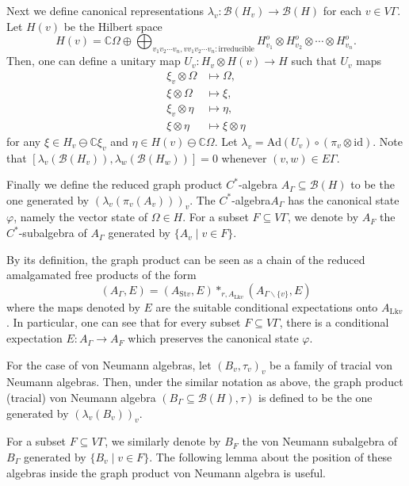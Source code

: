 \documentclass{amsart}
\theoremstyle{definition}
\renewcommand{\subset}{\subseteq}
\newcommand{\C}{\mathbb{C}}
\newcommand{\Cstaralg}{$C^{\ast}$-algebra\xspace}
\begin{document}
Next we define canonical representations $\lambda_v : \mathcal{B}(H_v) \to \mathcal{B}(H)$ for each $v\in V\Gamma$. Let $H(v)$ be the Hilbert space 
\[
H(v)=\mathbb{C}\Omega \oplus \bigoplus_{v_1v_2\cdots v_n, vv_1v_2\cdots v_n : \text{irreducible}} H_{v_1}^o \otimes H_{v_2}^o \otimes \cdots \otimes H_{v_n}^o. 
\]
Then, one can define a unitary map $U_v : H_v\otimes H(v) \to H$ such that
$U_v$ maps
\begin{align}
\xi_v\otimes \Omega &\longmapsto \Omega, \\
\xi\otimes \Omega &\longmapsto \xi, \\
\xi_v\otimes \eta &\longmapsto \eta, \\
\xi\otimes \eta &\longmapsto \xi\otimes \eta
\end{align}
for any $\xi\in H_v\ominus \C \xi_v$ and $\eta\in H(v)\ominus \C \Omega$. 
Let $\lambda_v = \mathrm{Ad}(U_v) \circ (\pi_v\otimes \mathrm{id})$. 
Note that $[\lambda_v(\mathcal{B}(H_v)), \lambda_w(\mathcal{B}(H_w))]=0$ whenever $(v,w)\in E\Gamma$. 

Finally we define the reduced graph product $C^{\ast}$-algebra
$A_{\Gamma}\subset \mathcal{B}(H)$ to be the one generated by
$(\lambda_v(\pi_v(A_v)))_v$. The \Cstaralg $A_{\Gamma}$ has the canonical state $\varphi$, namely the vector state of $\Omega \in H$. For a subset $F\subset V\Gamma$, we denote by $A_F$ the $C^{\ast}$-subalgebra of $A_{\Gamma}$ generated by $\{ A_v\mid v\in F\}$.  

By its definition, the graph product can be seen as a chain of the reduced amalgamated free products of the form
\[
(A_{\Gamma}, E)=(A_{\mathrm{St}v}, E) \ast_{r, A_{\mathrm{Lk}v}} (A_{\Gamma\backslash \{v \}}, E)
\]
where the maps denoted by $E$ are the suitable conditional expectations onto $A_{\mathrm{Lk}v}$. 
In particular, one can see that for every subset $F\subset V\Gamma$, 
there is a conditional expectation $E:A_{\Gamma}\to A_{F}$ which preserves the canonical state $\varphi$. 

For the case of von Neumann algebras, 
let $(B_v, \tau_v)_v$ be a family of tracial von Neumann algebras. 
Then, under the similar notation as above, the graph product (tracial) von Neumann algebra $(B_{\Gamma}\subset \mathcal{B}(H), \tau)$ is defined to be the one generated by $(\lambda_v(B_v))_v$. 

For a subset $F\subset V\Gamma$, we similarly denote by $B_F$ the von Neumann subalgebra of $B_{\Gamma}$ generated by $\{ B_v\mid v\in F\}$. 
The following lemma about the position of these algebras inside the graph product von Neumann algebra is useful. 
\end{document}

